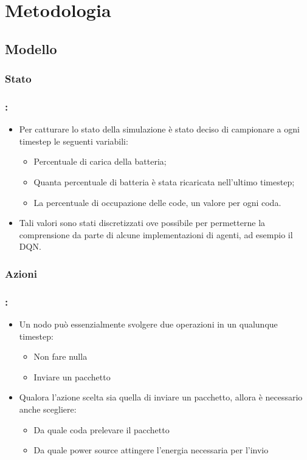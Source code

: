\documentclass[compress]{beamer}
\begin{document}
\section{Metodologia}
\subsection{Modello}
\subsubsection{Stato}
\begin{frame}
    \frametitle{\subsecname: \subsubsecname}
    \begin{itemize}
        \item Per catturare lo stato della simulazione è stato deciso di campionare a ogni timestep le
        seguenti variabili:
        \begin{itemize}
            \item Percentuale di carica della batteria;
            \item Quanta percentuale di batteria è stata ricaricata nell'ultimo timestep;
            \item La percentuale di occupazione delle code, un valore per ogni coda. 
        \end{itemize}
        \item Tali valori sono stati discretizzati ove possibile per permetterne la comprensione da
        parte di alcune implementazioni di agenti, ad esempio il DQN.        
    \end{itemize}
\end{frame}

\subsubsection{Azioni}
\begin{frame}
    \frametitle{\subsecname: \subsubsecname}
    \begin{itemize}
        \item Un nodo può essenzialmente svolgere due operazioni in un qualunque timestep:
        \begin{itemize}
            \item Non fare nulla
            \item Inviare un pacchetto
        \end{itemize}
            \item Qualora l'azione scelta sia quella di inviare un pacchetto, allora è necessario anche
            scegliere:
        \begin{itemize}
            \item Da quale coda prelevare il pacchetto
            \item Da quale power source attingere l'energia necessaria per l'invio
        \end{itemize}
    \end{itemize}
\end{frame}
\end{document}
